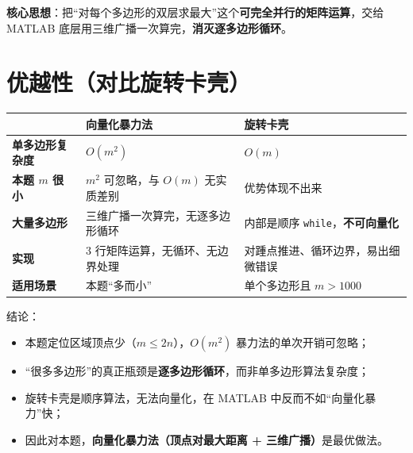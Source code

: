 \documentclass[11pt,a4paper]{ctexart}
\begin{document}
\textbf{核心思想}：把“对每个多边形的双层求最大”这个\textbf{可完全并行的矩阵运算}，交给
MATLAB 底层用三维广播一次算完，\textbf{消灭逐多边形循环}。

\section{优越性（对比旋转卡壳）}

\begin{table}[h]
\centering
\small
\renewcommand{\arraystretch}{1.35}
\begin{tabular}{>{\bfseries}p{3.2cm}p{5.4cm}p{5.4cm}}
\toprule
 & 向量化暴力法 & 旋转卡壳 \\
\midrule
单多边形复杂度 & $O(m^2)$ & $O(m)$ \\
本题 $m$ 很小 & $m^2$ 可忽略，与 $O(m)$ 无实质差别 & 优势体现不出来 \\
大量多边形 & 三维广播一次算完，无逐多边形循环 & 内部是顺序 \texttt{while}，\textbf{不可向量化} \\
实现 & 3 行矩阵运算，无循环、无边界处理 & 对踵点推进、循环边界，易出细微错误 \\
适用场景 & 本题“多而小” & 单个多边形且 $m>1000$ \\
\bottomrule
\end{tabular}
\end{table}

结论：

\begin{itemize}
\item 本题定位区域顶点少（$m\le 2n$），$O(m^2)$ 暴力法的单次开销可忽略；
\item “很多多边形”的真正瓶颈是\textbf{逐多边形循环}，而非单多边形算法复杂度；
\item 旋转卡壳是顺序算法，无法向量化，在 MATLAB 中反而不如“向量化暴力”快；
\item 因此对本题，\textbf{向量化暴力法（顶点对最大距离 + 三维广播）}是最优做法。
\end{itemize}
\end{document}
